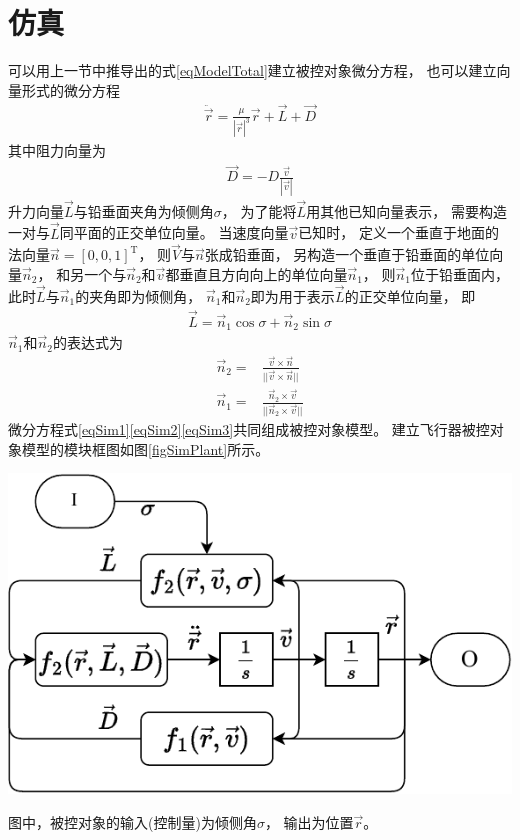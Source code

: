 \section{仿真}
可以用上一节中推导出的式\eqref{eqModelTotal}建立被控对象微分方程，
也可以建立向量形式的微分方程
\begin{align}
    \ddot{\vec{r}} = \frac{\mu}{|\vec{r}|^3}\vec{r}+\vec{L}+\vec{D} \label{eqSim1}
\end{align}
其中阻力向量为
\begin{align}
    \vec{D} = -D\frac{\vec{v}}{|\vec{v}|} \label{eqSim2}
\end{align}
升力向量$\vec{L}$与铅垂面夹角为倾侧角$\sigma$，
为了能将$\vec{L}$用其他已知向量表示，
需要构造一对与$\vec{L}$同平面的正交单位向量。
当速度向量$\vec{v}$已知时，
定义一个垂直于地面的法向量$\vec{n}=[0,0,1]^\text{T}$，
则$\vec{V}$与$\vec{n}$张成铅垂面，
另构造一个垂直于铅垂面的单位向量$\vec{n}_2$，
和另一个与$\vec{n}_2$和$\vec{v}$都垂直且方向向上的单位向量$\vec{n}_1$，
则$\vec{n}_1$位于铅垂面内，
此时$\vec{L}$与$\vec{n}_1$的夹角即为倾侧角，
$\vec{n}_1$和$\vec{n}_2$即为用于表示$\vec{L}$的正交单位向量，
即
\begin{align}
    \vec{L}=\vec{n}_1\cos\sigma + \vec{n}_2\sin\sigma \label{eqSim3}
\end{align}
$\vec{n}_1$和$\vec{n}_2$的表达式为
\begin{align*}
    \vec{n}_2 =& \frac{\vec{v}\times\vec{n}}{||\vec{v}\times\vec{n}||} \\
    \vec{n}_1 =& \frac{\vec{n}_2\times\vec{v}}{||\vec{n}_2\times\vec{v}||}
\end{align*}
微分方程式\eqref{eqSim1}\eqref{eqSim2}\eqref{eqSim3}共同组成被控对象模型。
建立飞行器被控对象模型的模块框图如图\ref{figSimPlant}所示。
\begin{center}
	\includegraphics[scale=0.8]{plant.pdf}  \\
	\label{figSimPlant}
\end{center}
图中，被控对象的输入(控制量)为倾侧角$\sigma$，
输出为位置$\vec{r}$。


